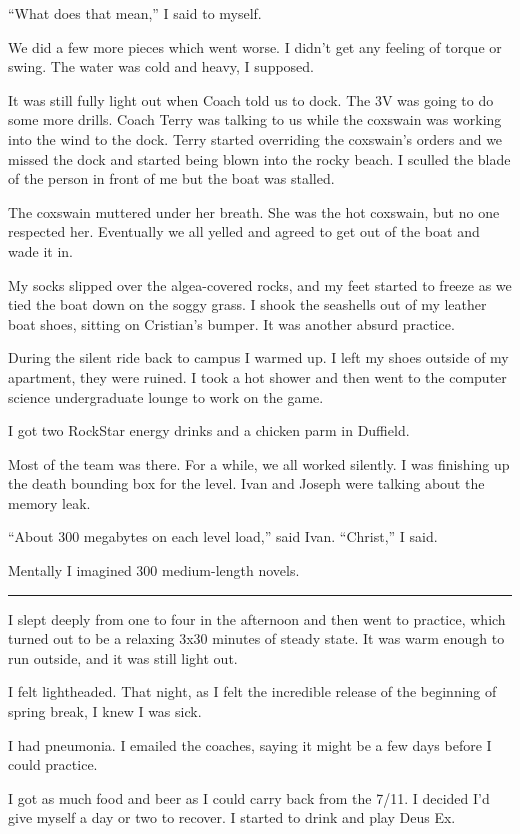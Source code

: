 ``What does that mean,'' I said to myself.

We did a few more pieces which went worse.  I didn't get any feeling of torque
or swing.  The water was cold and heavy, I supposed. 

It was still fully light out when Coach told us to dock.  The 3V was going to do
some more drills.  Coach Terry was talking to us while the coxswain was working
into the wind to the dock.  Terry started overriding the coxswain's orders and
we missed the dock and started being blown into the rocky beach.  I sculled the
blade of the person in front of me but the boat was stalled.

The coxswain muttered under her breath.  She was the hot coxswain, but no one
respected her.  Eventually we all yelled and agreed to get out of the boat and
wade it in.

My socks slipped over the algea-covered rocks, and my feet started to freeze as
we tied the boat down on the soggy grass.  I shook the seashells out of my
leather boat shoes, sitting on Cristian's bumper.  It was another absurd
practice.  

During the silent ride back to campus I warmed up.  I left my shoes outside of
my apartment, they were ruined.  I took a hot shower and then went to the
computer science undergraduate lounge to work on the game.

I got two RockStar energy drinks and a chicken parm in Duffield.

Most of the team was there.  For a while, we all worked silently.  I was
finishing up the death bounding box for the level.  Ivan and Joseph were
talking about the memory leak.

``About 300 megabytes on each level load,'' said Ivan.  ``Christ,'' I said.

Mentally I imagined 300 medium-length novels.

\plainfancybreak{12pt}{2}{* * *}

I slept deeply from one to four in the afternoon and then went to practice,
which turned out to be a relaxing 3x30 minutes of steady state.  It was warm
enough to run outside, and it was still light out.

I felt lightheaded.  That night, as I felt the incredible release of the
beginning of spring break, I knew I was sick.  

I had pneumonia.  I emailed the coaches, saying it might be a few days before I
could practice.  

I got as much food and beer as I could carry back from the 7/11.  I decided I'd
give myself a day or two to recover.  I started to drink and play Deus Ex.  

